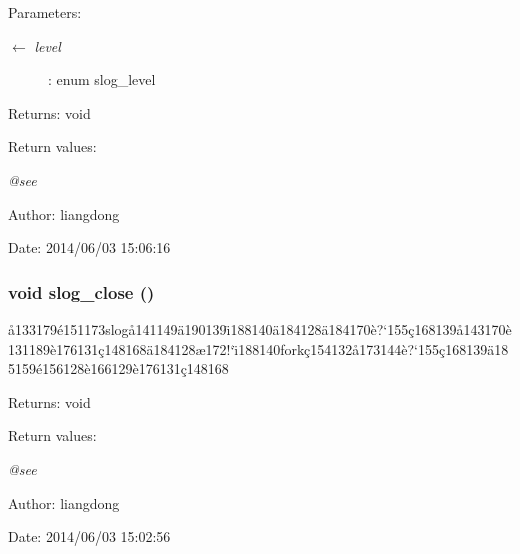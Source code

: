 \begin{Desc}
\item[Parameters:]
\begin{description}
\item[\mbox{$\leftarrow$} {\em level}]: enum slog\_\-level \end{description}
\end{Desc}
\begin{Desc}
\item[Returns:]void \end{Desc}
\begin{Desc}
\item[Return values:]
\begin{description}
\item[{\em @see}]\end{description}
\end{Desc}
\begin{Desc}
\item[Author:]liangdong \end{Desc}
\begin{Desc}
\item[Date:]2014/06/03 15:06:16 \end{Desc}
\subsubsection{\setlength{\rightskip}{0pt plus 5cm}void slog\_\-close ()}\label{slog_8c_a8}


\aa{}133179\'{e}151173slog\aa{}141149\"{a}190139\"{\i}188140\"{a}184128\"{a}184170\`{e}?`155\c{c}168139\aa{}143170\`{e}131189\`{e}176131\c{c}148168\"{a}184128\ae{}172!`\"{\i}188140fork\c{c}154132\aa{}173144\`{e}?`155\c{c}168139\"{a}185159\'{e}156128\`{e}166129\`{e}176131\c{c}148168 

\begin{Desc}
\item[Returns:]void \end{Desc}
\begin{Desc}
\item[Return values:]
\begin{description}
\item[{\em @see}]\end{description}
\end{Desc}
\begin{Desc}
\item[Author:]liangdong \end{Desc}
\begin{Desc}
\item[Date:]2014/06/03 15:02:56 \end{Desc}

